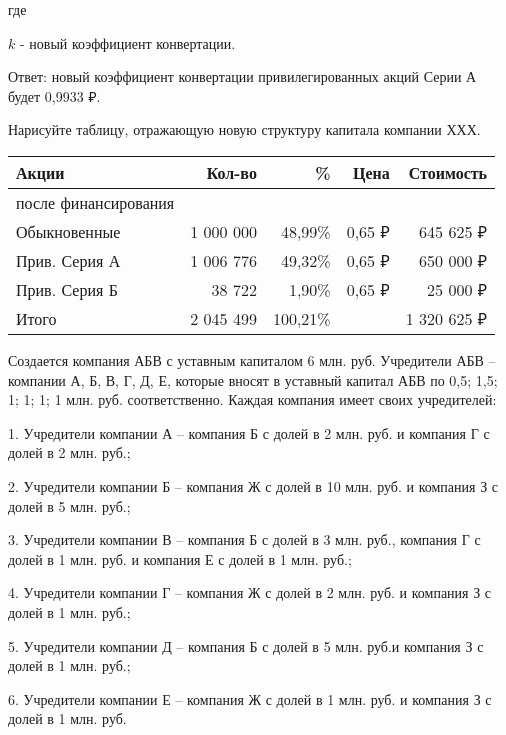 \documentclass[12pt, table]{exam}
\begin{document}
\begin{questions}
\begin{subparts}
\begin{solution}[9em]
	где
	
	$k$ - новый коэффициент конвертации.
	
	Ответ: новый коэффициент конвертации привилегированных акций Серии А будет  0,9933 ₽.
\end{solution}

\subpart[5] Нарисуйте таблицу, отражающую новую структуру капитала компании ХХХ.
\begin{solution}[12em]
\begin{tabular}{lrrrr}
	\toprule
	Акции & Кол-во & \%    & Цена  & Стоимость \\
	\midrule
	после финансирования &       &       &       &  \\
	Обыкновенные &                 1 000 000    & 48,99\% &               0,65 ₽  &            645 625 ₽  \\
	Прив. Серия А &                 1 006 776    & 49,32\% &               0,65 ₽  &            650 000 ₽  \\
	Прив. Серия Б &                       38 722    & 1,90\% &               0,65 ₽  &              25 000 ₽  \\
	Итого &                 2 045 499    & 100,21\% &       &         1 320 625 ₽  \\
	\bottomrule
\end{tabular}%
\end{solution}

\end{subparts}
\addpoints

\pagebreak
\question[20]
Создается компания АБВ с уставным капиталом 6 млн. руб. Учредители АБВ – компании А, Б, В, Г, Д, Е, которые вносят в уставный капитал АБВ по 0,5; 1,5; 1; 1; 1; 1 млн. руб. соответственно. Каждая компания имеет своих учредителей:

1.	Учредители компании А – компания Б с долей в 2 млн. руб. и компания Г с долей в 2 млн. руб.;

2.	Учредители компании Б – компания Ж с долей в 10 млн. руб. и компания З с долей в 5 млн. руб.;

3.	Учредители компании В – компания Б с долей в 3 млн. руб., компания Г с долей в 1 млн. руб. и компания Е с долей в 1 млн. руб.;

4.	Учредители компании Г – компания Ж с долей в 2 млн. руб. и компания З с долей в 1 млн. руб.;

5.	Учредители компании Д – компания Б с долей в 5 млн. руб.и компания З с долей в 1 млн. руб.;

6.	Учредители компании Е – компания Ж с долей в 1 млн. руб. и компания З с долей в 1 млн. руб.


\end{questions}
\end{document}
